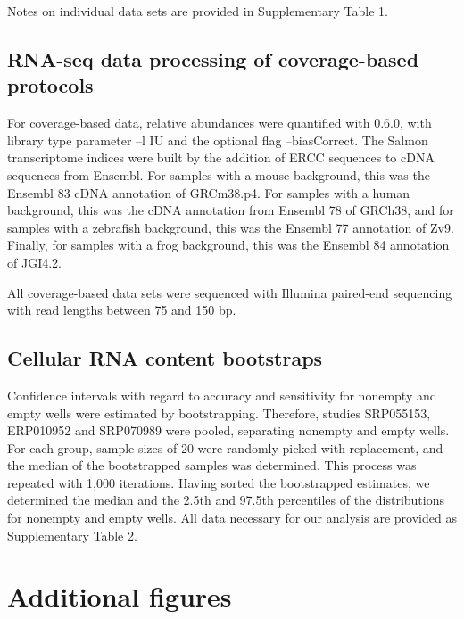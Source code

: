 Notes on individual data sets are provided in Supplementary Table 1.

\subsection{RNA-seq data processing of coverage-based protocols} \label{sec:salmon}

For coverage-based data, relative abundances were quantified with  \cite{Patro2017-wf} 0.6.0, with library type parameter --l IU and the optional flag --biasCorrect. The Salmon transcriptome indices were built by the addition of ERCC sequences to cDNA sequences from Ensembl. For samples with a mouse background, this was the Ensembl 83 cDNA annotation of GRCm38.p4. For samples with a human background, this was the cDNA annotation from Ensembl 78 of GRCh38, and for samples with a zebrafish background, this was the Ensembl 77 annotation of Zv9. Finally, for samples with a frog background, this was the Ensembl 84 annotation of JGI4.2.

All coverage-based data sets were sequenced with Illumina paired-end sequencing with read lengths between 75 and 150 bp.

\subsection{Cellular RNA content bootstraps}

Confidence intervals with regard to accuracy and sensitivity for nonempty and empty wells were estimated by bootstrapping. Therefore, studies SRP055153, ERP010952 and SRP070989 were pooled, separating nonempty and empty wells. For each group, sample sizes of 20 were randomly picked with replacement, and the median of the bootstrapped samples was determined. This process was repeated with 1,000 iterations. Having sorted the bootstrapped estimates, we determined the median and the 2.5th and 97.5th percentiles of the distributions for nonempty and empty wells. All data necessary for our analysis are provided as Supplementary Table 2.

\section{Additional figures}

